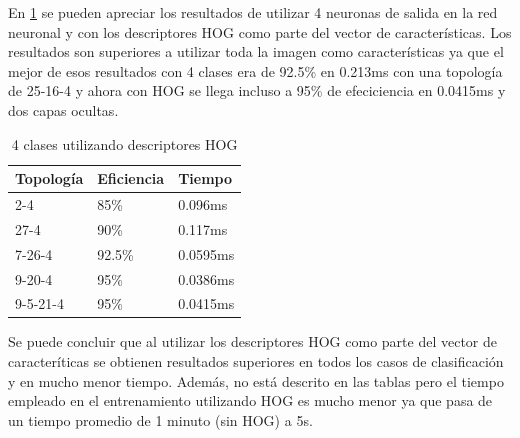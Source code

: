 En \ref{Hog4Clases} se pueden apreciar los resultados de utilizar 4 neuronas de salida en la red neuronal y con los descriptores HOG como parte del vector de características. Los resultados son superiores a utilizar toda la imagen como características ya que el mejor de esos resultados con 4 clases era de 92.5\% en 0.213ms con una topología de 25-16-4 y ahora con HOG se llega incluso a 95\% de efeciciencia en 0.0415ms y dos capas ocultas.
\begin{table}[]
	\centering
	\caption{4 clases utilizando descriptores HOG}
	\label{my-label}
	\begin{tabular}{|l|l|l|}
		\hline
		Topología & Eficiencia & Tiempo   \\ \hline
		2-4       & 85\%       & 0.096ms  \\ \hline
		27-4      & 90\%       & 0.117ms  \\ \hline
		7-26-4    & 92.5\%     & 0.0595ms \\ \hline
		9-20-4    & 95\%       & 0.0386ms \\ \hline
		9-5-21-4  & 95\%       & 0.0415ms \\ \hline
	\end{tabular}\label{Hog4Clases}
\end{table}

Se puede concluir que al utilizar los descriptores HOG como parte del vector de caracteríticas se obtienen resultados superiores en todos los casos de clasificación y en mucho menor tiempo. Además, no está descrito en las tablas pero el tiempo empleado en el entrenamiento utilizando HOG es mucho menor ya que pasa de un tiempo promedio de 1 minuto (sin HOG) a 5s.